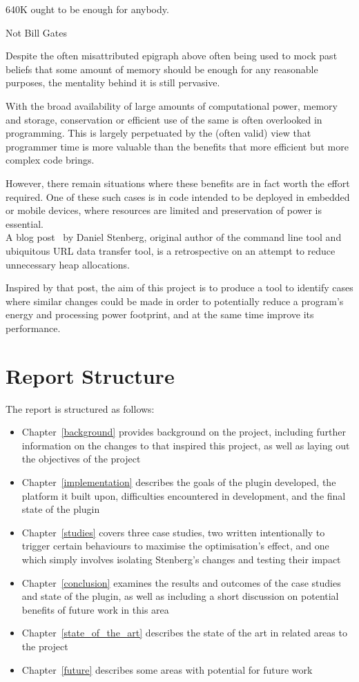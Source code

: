 \epigraph{640K ought to be enough for anybody.}{Not Bill Gates}

Despite the often misattributed epigraph above often being used to mock past beliefs that some amount of memory should be enough for any reasonable purposes, the mentality behind it is still pervasive.

With the broad availability of large amounts of computational power, memory and storage, conservation or efficient use of the same is often overlooked in programming. This is largely perpetuated by the (often valid) view that programmer time is more valuable than the benefits that more efficient but more complex code brings.

However, there remain situations where these benefits are in fact worth the effort required. One of these such cases is in code intended to be deployed in embedded or mobile devices, where resources are limited and preservation of power is essential. \\
A blog post~\cite{curlmalloc} by Daniel Stenberg, original author of the  command line tool and ubiquitous URL data transfer tool, is a retrospective on an attempt to reduce unnecessary heap allocations.

Inspired by that post, the aim of this project is to produce a tool to identify cases where similar changes could be made in order to potentially reduce a program's energy and processing power footprint, and at the same time improve its performance.

\section{Report Structure}

The report is structured as follows:

\begin{itemize}
	\item{Chapter~\ref{background} provides background on the project, including further information on the changes to  that inspired this project, as well as laying out the objectives of the project}
	\item{Chapter~\ref{implementation} describes the goals of the plugin developed, the platform it built upon, difficulties encountered in development, and the final state of the plugin}
	\item{Chapter~\ref{studies} covers three case studies, two written intentionally to trigger certain behaviours to maximise the optimisation's effect, and one which simply involves isolating Stenberg's changes and testing their impact}
	\item{Chapter~\ref{conclusion} examines the results and outcomes of the case studies and state of the plugin, as well as including a short discussion on potential benefits of future work in this area}
	\item{Chapter~\ref{state_of_the_art} describes the state of the art in related areas to the project}
	\item{Chapter~\ref{future} describes some areas with potential for future work}
\end{itemize}
